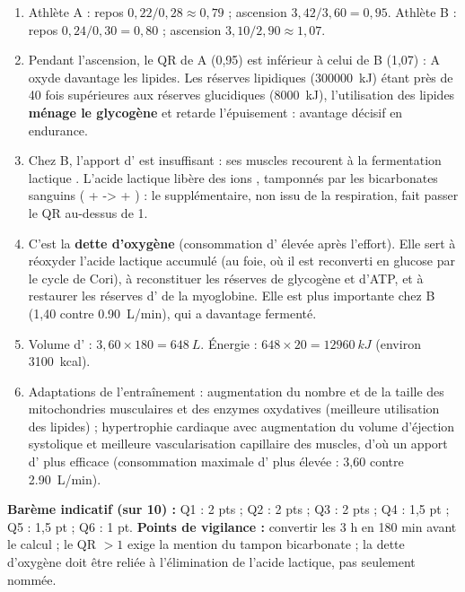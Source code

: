\documentclass[11pt]{article}
\begin{document}
\begin{corrige}
\begin{enumerate}
\item Athlète A : repos $0,22/0,28 \approx 0,79$ ; ascension $3,42/3,60 = 0,95$. Athlète B : repos $0,24/0,30 = 0,80$ ; ascension $3,10/2,90 \approx 1,07$.
\item Pendant l'ascension, le QR de A (0,95) est inférieur à celui de B (1,07) : A oxyde davantage les lipides. Les réserves lipidiques (\SI{300000}{kJ}) étant près de 40 fois supérieures aux réserves glucidiques (\SI{8000}{kJ}), l'utilisation des lipides \textbf{ménage le glycogène} et retarde l'épuisement : avantage décisif en endurance.
\item Chez B, l'apport d' est insuffisant : ses muscles recourent à la fermentation lactique . L'acide lactique libère des ions , tamponnés par les bicarbonates sanguins ( +  ->  + ) : le  supplémentaire, non issu de la respiration, fait passer le QR au-dessus de 1.
\item C'est la \textbf{dette d'oxygène} (consommation d' élevée après l'effort). Elle sert à réoxyder l'acide lactique accumulé (au foie, où il est reconverti en glucose par le cycle de Cori), à reconstituer les réserves de glycogène et d'ATP, et à restaurer les réserves d' de la myoglobine. Elle est plus importante chez B (1,40 contre \SI{0,90}{L/min}), qui a davantage fermenté.
\item Volume d' : $3,60 \times 180 = \SI{648}{L}$. Énergie : $648 \times 20 = \SI{12960}{kJ}$ (environ \SI{3100}{kcal}).
\item Adaptations de l'entraînement : augmentation du nombre et de la taille des mitochondries musculaires et des enzymes oxydatives (meilleure utilisation des lipides) ; hypertrophie cardiaque avec augmentation du volume d'éjection systolique et meilleure vascularisation capillaire des muscles, d'où un apport d' plus efficace (consommation maximale d' plus élevée : 3,60 contre \SI{2,90}{L/min}).
\end{enumerate}
\textbf{Barème indicatif (sur 10) :} Q1 : 2 pts ; Q2 : 2 pts ; Q3 : 2 pts ; Q4 : 1,5 pt ; Q5 : 1,5 pt ; Q6 : 1 pt.
\textbf{Points de vigilance :} convertir les 3 h en 180 min avant le calcul ; le QR $> 1$ exige la mention du tampon bicarbonate ; la dette d'oxygène doit être reliée à l'élimination de l'acide lactique, pas seulement nommée.
\end{corrige}
\end{document}
